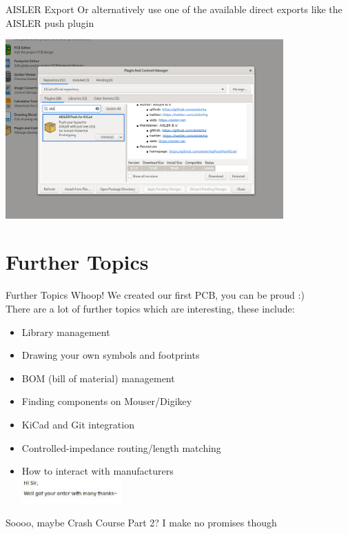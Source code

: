 \documentclass{beamer}
\begin{document}
\begin{frame}{AISLER Export}
  Or alternatively use one of the available direct exports like the AISLER push plugin
  \begin{center}
    \includegraphics[width=0.8\textwidth]{images/aisler-export.png}
  \end{center}
\end{frame}

\section{Further Topics}

\begin{frame}{Further Topics}
  Whoop! We created our first PCB, you can be proud :)\\
  There are a lot of further topics which are interesting, these include:
  \begin{itemize}
    \item Library management
    \item Drawing your own symbols and footprints
    \item BOM (bill of material) management
    \item Finding components on Mouser/Digikey
    \item KiCad and Git integration
    \item Controlled-impedance routing/length matching
    \item How to interact with manufacturers\\
      \includegraphics[width=0.3\textwidth]{images/well-got-your-order.jpg}
  \end{itemize}
  \small
  Soooo, maybe Crash Course Part 2? I make no promises though
\end{frame}
\end{document}
